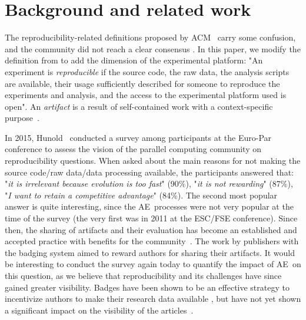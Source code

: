 \documentclass[sigconf,natbib=false]{acmart}
\newcommand{\aeval}{AE}
\begin{document}
%
\section{Background and related work}\label{sec:background}

The reproducibility-related definitions proposed by ACM\ \cite{acm-badges} carry some confusion, and the community did not reach a clear consensus \cite{plesser2018reproducibility, barba2018terminologies}.
In this paper, we modify the definition from \cite{rougier2019rescience} to add the dimension of the experimental platform:
"An experiment is \emph{reproducible} if the source code, the raw data, the analysis scripts are available, their usage sufficiently described for someone to reproduce the experiments and analysis, and the access to the experimental platform used is open".
An \emph{artifact} is a result of self-contained work with a context-specific purpose\ \cite{mendez2019artefacts}.

In 2015, Hunold\ \cite{hunold2015survey} conducted a survey among participants at the Euro-Par conference to assess the vision of the parallel computing community on reproducibility questions. 
When asked about the main reasons for not making the source code/raw data/data processing available, the participants answered that: "\emph{it is irrelevant because evolution is too fast}" (90\%), "\emph{it is not rewarding}" (87\%), "\emph{I want to retain a competitive advantage}" (84\%).
The second most popular answer is quite interesting, since the \aeval\ processes were not very popular at the time of the survey (the very first was in 2011 at the ESC/FSE conference).
Since then, the sharing of artifacts and their evaluation has become an established and accepted practice with benefits for the community\ \cite{hermann2022has}.
The work by publishers with the badging system aimed to reward authors for sharing their artifacts.
It would be interesting to conduct the survey again today to quantify the impact of \aeval\ on this question, as we believe that reproducibility and its challenges have since gained greater visibility.
Badges have been shown to be an effective strategy to incentivize authors to make their research data available \cite{kidwell2016badges, rowhani2017incentives}, but have not yet shown a significant impact on the visibility of the articles\ \cite{winter2022retrospective, frachtenberg2022research, heumuller2020publish}. 
\end{document}

